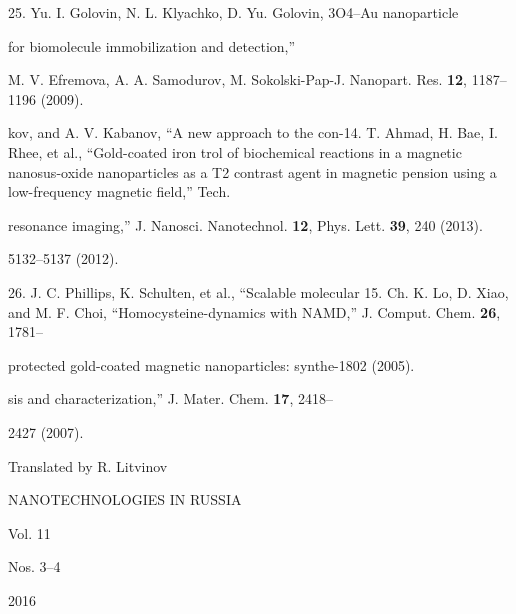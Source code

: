 \documentclass[12pt,a4paper]{article}
\begin{document}
25. Yu. I. Golovin, N. L. Klyachko, D. Yu. Golovin, 3O4--Au nanoparticle

for biomolecule immobilization and detection,''

M. V. Efremova, A. A. Samodurov, M. Sokolski-Pap-J. Nanopart. Res.
\textbf{12}, 1187--1196 (2009).

kov, and A. V. Kabanov, ``A new approach to the con-14. T. Ahmad, H.
Bae, I. Rhee, et al., ``Gold-coated iron trol of biochemical reactions
in a magnetic nanosus-oxide nanoparticles as a T2 contrast agent in
magnetic pension using a low-frequency magnetic field,'' Tech.

resonance imaging,'' J. Nanosci. Nanotechnol. \textbf{12}, Phys. Lett.
\textbf{39}, 240 (2013).

5132--5137 (2012).

26. J. C. Phillips, K. Schulten, et al., ``Scalable molecular 15. Ch. K.
Lo, D. Xiao, and M. F. Choi, ``Homocysteine-dynamics with NAMD,'' J.
Comput. Chem. \textbf{26}, 1781--

protected gold-coated magnetic nanoparticles: synthe-1802 (2005).

sis and characterization,'' J. Mater. Chem. \textbf{17}, 2418--

2427 (2007).

Translated by R. Litvinov

NANOTECHNOLOGIES IN RUSSIA

Vol. 11

Nos. 3--4

2016
\end{document}
